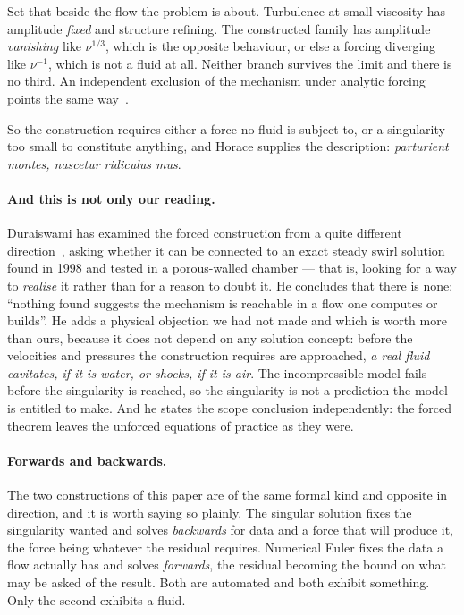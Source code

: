 \documentclass[11pt]{article}
\begin{document}
Set that beside the flow the problem is about. Turbulence at small viscosity has amplitude
\emph{fixed} and structure refining. The constructed family has amplitude \emph{vanishing} like
$\nu^{1/3}$, which is the opposite behaviour, or else a forcing diverging like $\nu^{-1}$, which is
not a fluid at all. Neither branch survives the limit and there is no third. An independent exclusion
of the mechanism under analytic forcing points the same way~\cite{civ}.

So the construction requires either a force no fluid is subject to, or a singularity too small to
constitute anything, and Horace supplies the description: \emph{parturient montes, nascetur
ridiculus mus}.

\paragraph{And this is not only our reading.} Duraiswami has examined the forced construction from a
quite different direction~\cite{duraiswami}, asking whether it can be connected to an exact steady
swirl solution found in 1998 and tested in a porous-walled chamber --- that is, looking for a way to
\emph{realise} it rather than for a reason to doubt it. He concludes that there is none:
``nothing found suggests the mechanism is reachable in a flow one computes or builds''. He adds a
physical objection we had not made and which is worth more than ours, because it does not depend on
any solution concept: before the velocities and pressures the construction requires are approached,
\emph{a real fluid cavitates, if it is water, or shocks, if it is air}. The incompressible model
fails before the singularity is reached, so the singularity is not a prediction the model is entitled
to make. And he states the scope conclusion independently: the forced theorem leaves the unforced
equations of practice as they were.

\paragraph{Forwards and backwards.} The two constructions of this paper are of the same formal kind
and opposite in direction, and it is worth saying so plainly. The singular solution fixes the
singularity wanted and solves \emph{backwards} for data and a force that will produce it, the force
being whatever the residual requires. Numerical Euler fixes the data a flow actually has and solves
\emph{forwards}, the residual becoming the bound on what may be asked of the result. Both are
automated and both exhibit something. Only the second exhibits a fluid.
\end{document}

